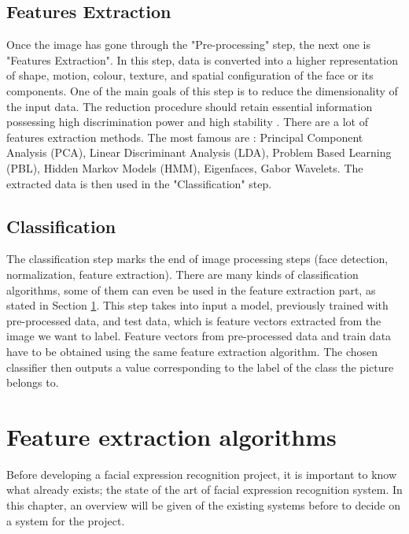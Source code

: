 \subsection{Features Extraction}

\vspace{\baselineskip}
\noindent Once the image has gone through the "Pre-processing" step, the next one is "Features Extraction". In this step, data is converted into a higher representation of shape, motion, colour, texture, and spatial configuration of the face or its components. One of the main goals of this step is to reduce the dimensionality of the input data. The reduction procedure should retain essential information possessing high discrimination power and high stability \cite{CHI03}. There are a lot of features extraction methods. The most famous are : Principal Component Analysis (PCA), Linear Discriminant Analysis (LDA), Problem Based Learning (PBL), Hidden Markov Models (HMM), Eigenfaces, Gabor Wavelets. The extracted data is then used in the "Classification" step.
\newline

\subsection{Classification}

\noindent The classification step marks the end of image processing steps (face detection, normalization, feature extraction). There are many kinds of classification algorithms, some of them can even be used in the feature extraction part, as stated in Section \ref{feat_x}. This step takes into input a model, previously trained with pre-processed data, and test data, which is feature vectors extracted from the image we want to label. Feature vectors from pre-processed data and train data have to be obtained using the same feature extraction algorithm. The chosen classifier then outputs a value corresponding to the label of the class the picture belongs to.

\section{Feature extraction algorithms} \label{feat_x}

\vspace{\baselineskip}
\noindent Before developing a facial expression recognition project, it is important to know what already exists; the state of the art of facial expression recognition system. In this chapter, an overview will be given of the existing systems before to decide on a system for the project.
\newline

